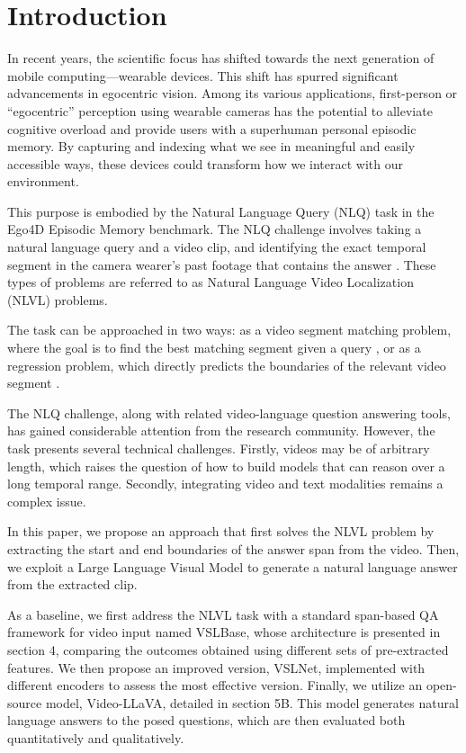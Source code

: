 \documentclass[conference]{IEEEtran}
\begin{document}
\section{Introduction}
In recent years, the scientific focus has shifted towards the next generation of mobile computing—wearable devices. This shift has spurred significant advancements in egocentric vision. Among its various applications, first-person or “egocentric” perception using wearable cameras has the potential to alleviate cognitive overload and provide users with a superhuman personal episodic memory. By capturing and indexing what we see in meaningful and easily accessible ways, these devices could transform how we interact with our environment.

This purpose is embodied by the Natural Language Query (NLQ) task in the Ego4D Episodic Memory benchmark. The NLQ challenge involves taking a natural language query and a video clip, and identifying the exact temporal segment in the camera wearer's past footage that contains the answer \cite{b1}. These types of problems are referred to as Natural Language Video Localization (NLVL) problems.

The task can be approached in two ways: as a video segment matching problem, where the goal is to find the best matching segment given a query \cite{b2}, or as a regression problem, which directly predicts the boundaries of the relevant video segment \cite{b3}.

The NLQ challenge, along with related video-language question answering tools, has gained considerable attention from the research community. However, the task presents several technical challenges. Firstly, videos may be of arbitrary length, which raises the question of how to build models that can reason over a long temporal range. Secondly, integrating video and text modalities remains a complex issue.

In this paper, we propose an approach that first solves the NLVL problem by extracting the start and end boundaries of the answer span from the video. Then, we exploit a Large Language Visual Model to generate a natural language answer from the extracted clip.

As a baseline, we first address the NLVL task with a standard span-based QA framework for video input named VSLBase, whose architecture is presented in section 4, comparing the outcomes obtained using different sets of pre-extracted features. We then propose an improved version, VSLNet, implemented with different encoders to assess the most effective version. Finally, we utilize an open-source model, Video-LLaVA, detailed in section 5B. This model generates natural language answers to the posed questions, which are then evaluated both quantitatively and qualitatively.
\end{document}
